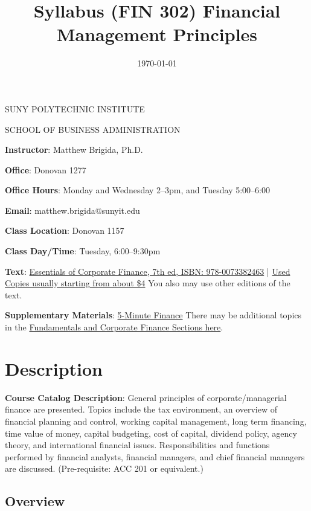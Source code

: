 \documentclass[11pt]{article}
\date{\today}
\title{Syllabus (FIN 302) Financial Management Principles}
\begin{document}
\maketitle
\tableofcontents

\begin{center}
SUNY POLYTECHNIC INSTITUTE

SCHOOL OF BUSINESS ADMINISTRATION
\end{center}


\textbf{\textbf{Instructor}}: Matthew Brigida, Ph.D.

\textbf{\textbf{Office}}: Donovan 1277

\textbf{\textbf{Office Hours}}: Monday and Wednesday 2--3pm, and Tuesday 5:00--6:00

\textbf{\textbf{Email}}:  matthew.brigida@sunyit.edu

\textbf{\textbf{Class Location}}:  Donovan 1157

\textbf{\textbf{Class Day/Time}}: Tuesday, 6:00--9:30pm

\textbf{\textbf{Text}}: \href{https://www.amazon.com/dp/0073382469/ref=olp\_product\_details?\_encoding=UTF8\&me=}{Essentials of Corporate Finance, 7th ed, ISBN: 978-0073382463} | \href{https://www.amazon.com/gp/offer-listing/0073382469/ref=dp\_olp\_used?ie=UTF8\&condition=used}{Used Copies usually starting from about \$4} You also may use other editions of the text.

\textbf{\textbf{Supplementary Materials}}: \href{https://www.5minutefinance.org/}{5-Minute Finance} There may be additional topics in the \href{https://github.com/FinancialMarkets/5MinuteFinance}{Fundamentals and Corporate Finance Sections here}.


\section{Description}
\label{sec:org48331ca}

\textbf{\textbf{Course Catalog Description}}: General principles of corporate/managerial finance are presented. Topics include the tax environment, an overview of financial planning and control, working capital management, long term financing, time value of money, capital budgeting, cost of capital, dividend policy, agency theory, and international financial issues. Responsibilities and functions performed by financial analysts, financial managers, and chief financial managers are discussed. (Pre-requisite: ACC 201 or equivalent.)

\subsection{Overview}
\label{sec:org73a2606}
\end{document}
